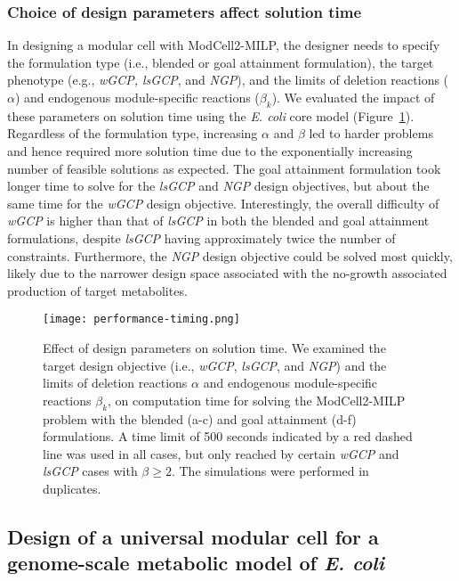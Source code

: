 \subsubsection{Choice of design parameters affect solution time}
In designing a modular cell with ModCell2-MILP, the designer needs to specify the formulation type (i.e., blended or goal attainment formulation), the target phenotype (e.g., \textit{wGCP, lsGCP}, and \textit{NGP}), and the limits of deletion reactions ($\alpha$) and endogenous module-specific reactions ($\beta_{k}$). We evaluated the impact of these parameters on solution time using the \textit{E. coli} core model (Figure~\ref{fig5:times}).  Regardless of the formulation type, increasing $\alpha$ and $\beta$ led to harder problems and hence required more solution time due to the exponentially increasing number of feasible solutions as expected. The goal attainment formulation took longer time to solve for the \textit{lsGCP} and \textit{NGP} design objectives, but about the same time for the \textit{wGCP} design objective. Interestingly, the overall difficulty of \textit{wGCP} is higher than that of \textit{lsGCP} in both the blended and goal attainment formulations, despite \textit{lsGCP} having approximately twice the number of constraints. Furthermore, the \textit{NGP} design objective could be solved most quickly, likely due to the narrower design space associated with the no-growth associated production of target metabolites.

\begin{figure}[hp]
    \caption[Effect of design parameters on solution time]{Effect of design parameters on solution time. We examined the target design objective (i.e., \textit{wGCP}, \textit{lsGCP}, and \textit{NGP}) and the limits of deletion reactions $\alpha$ and endogenous module-specific reactions $\beta_k$, on computation time for solving the ModCell2-MILP problem with the blended (a-c) and goal attainment (d-f) formulations. A time limit of 500 seconds indicated by a red dashed line was used in all cases, but only reached by certain \textit{wGCP} and \textit{lsGCP} cases with $\beta \ge2$. The simulations were performed in duplicates.}
    \centering
    \texttt{[image: performance-timing.png]}
    \label{fig5:times}
\end{figure}

\subsection{Design of a universal modular cell for a genome-scale metabolic model of \textit{E. coli}} \label{sec:univ_design}

